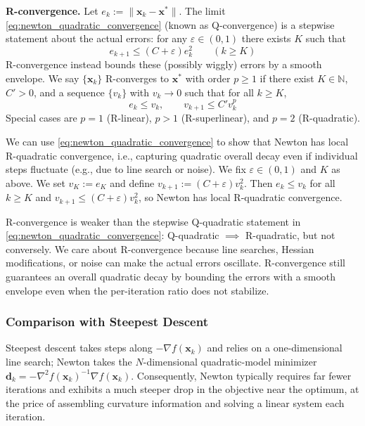 \textbf{R-convergence.}\quad
Let $e_k:=\|\mathbf{x}_k-\mathbf{x}^\ast\|$. The limit \autoref{eq:newton_quadratic_convergence} (known as Q-convergence) is a stepwise statement about the actual errors: for any $\varepsilon\in(0,1)$ there exists $K$ such that
\begin{equation}
e_{k+1}\le (C+\varepsilon)e_k^{2}\qquad(k\ge K)
\end{equation}
R-convergence instead bounds these (possibly wiggly) errors by a smooth envelope. We say $\{\mathbf{x}_k\}$ R-converges to $\mathbf{x}^\ast$ with order $p\ge 1$ if there exist $K\in\mathbb{N}$, $C'>0$, and a sequence $\{v_k\}$ with $v_k\to 0$ such that for all $k\ge K$,
\begin{equation}
e_k\le v_k,\qquad v_{k+1}\le C' v_k^{p}
\end{equation}
Special cases are $p=1$ (R-linear), $p>1$ (R-superlinear), and $p=2$ (R-quadratic).

We can use \autoref{eq:newton_quadratic_convergence} to show that Newton has local R-quadratic convergence, i.e., capturing quadratic overall decay even if individual steps fluctuate (e.g., due to line search or noise). We fix $\varepsilon\in(0,1)$ and $K$ as above. We set $v_K:=e_K$ and define $v_{k+1}:=(C+\varepsilon) v_k^{2}$. Then $e_k\le v_k$ for all $k\ge K$ and $v_{k+1}\le (C+\varepsilon)v_k^{2}$, so Newton has local R-quadratic convergence.

R-convergence is weaker than the stepwise Q-quadratic statement in \autoref{eq:newton_quadratic_convergence}: Q-quadratic $\implies$ R-quadratic, but not conversely. We care about R-convergence because line searches, Hessian modifications, or noise can make the actual errors oscillate. R-convergence still guarantees an overall quadratic decay by bounding the errors with a smooth envelope even when the per-iteration ratio does not stabilize.


\subsubsection{Comparison with Steepest Descent}
Steepest descent takes steps along $-\nabla f(\mathbf{x}_k)$ and relies on a one-dimensional line search; Newton takes the $N$-dimensional quadratic-model minimizer $\mathbf{d}_k=-\nabla^2 f(\mathbf{x}_k)^{-1}\nabla f(\mathbf{x}_k)$. Consequently, Newton typically requires far fewer iterations and exhibits a much steeper drop in the objective near the optimum, at the price of assembling curvature information and solving a linear system each iteration.

